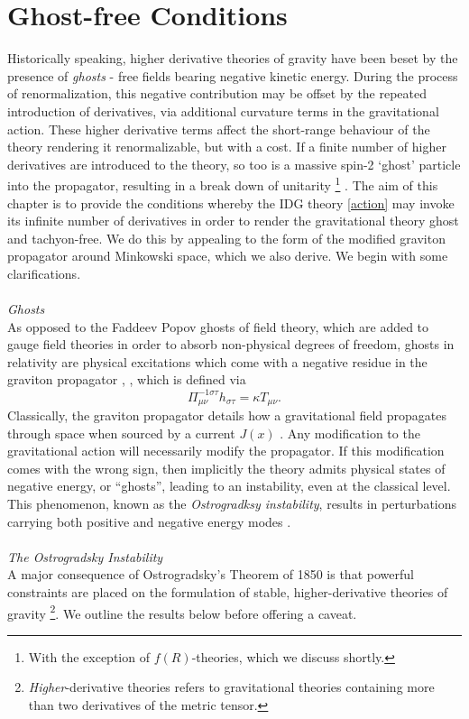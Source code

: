 \chapter{Ghost-free Conditions}
\label{chap:GF}
Historically speaking, higher derivative theories of gravity have been beset by the presence of \emph{ghosts} - free fields bearing negative kinetic energy. During the process of renormalization, this negative contribution may be offset by the repeated introduction of derivatives, via additional curvature terms in the gravitational action. These higher derivative terms affect the short-range behaviour of the theory rendering it renormalizable, but with a cost. If a finite number of higher derivatives are introduced to the theory, so too is a massive spin-2 `ghost' particle into the propagator, resulting in a break down of unitarity \footnote{With the exception of $f(R)$-theories, which we discuss shortly.} \cite{ellis2012relativistic}. The aim of this chapter is to provide the conditions whereby the IDG theory \eqref{action} may invoke its infinite number of derivatives in order to render the gravitational theory ghost and tachyon-free. We do this by appealing to the form of the modified graviton propagator around Minkowski space, which we also derive. We begin with some clarifications.
\\\\\emph{Ghosts}
\\As opposed to the Faddeev Popov ghosts of field theory, which are added to gauge field theories in order to absorb non-physical degrees of freedom, ghosts in relativity are physical excitations which come with a negative residue in the graviton propagator \cite{Clifton:2011jh}, \cite{VanNieuwenhuizen:1973fi}, which is defined via
\[
\Pi^{-1\sigma\tau}_{\mu\nu}h_{\sigma\tau}=\kappa T_{\mu\nu}.
\]
 Classically, the graviton propagator details how a gravitational field propagates through space when sourced by a current $J(x)$ \cite{Schwartz:2013pla}. Any modification to the gravitational action will necessarily modify the propagator. If this modification comes with the wrong sign, then implicitly the theory admits physical states of negative energy, or ``ghosts'', leading to an instability, even at the classical level. This phenomenon, known as the \emph{Ostrogradksy instability}, results in perturbations carrying both positive and negative energy modes \cite{Abramo:2009qk}. 
\\\\\emph{The Ostrogradsky Instability}\\
A major consequence of Ostrogradsky's Theorem of 1850 \cite{Ostrogradsky:1850fid} is that powerful constraints are placed on the formulation of stable, higher-derivative theories of gravity \footnote{\emph{Higher}-derivative theories refers to gravitational theories containing more than two derivatives of the metric tensor.}. We outline the results below before offering a caveat.

